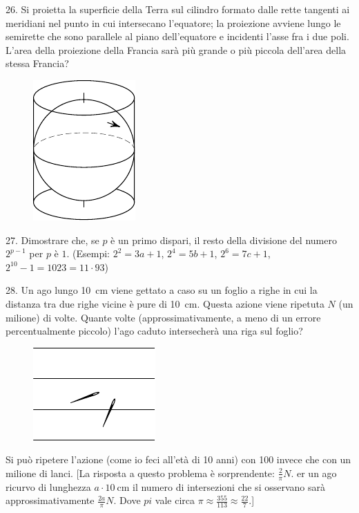 \begin{problem}{26.}
	Si proietta la superficie della Terra sul cilindro formato dalle rette tangenti ai meridiani nel punto in cui intersecano l’equatore; la proiezione avviene lungo le semirette che sono parallele al piano dell’equatore e incidenti l’asse fra i due poli. L’area della proiezione della Francia sarà più grande o più piccola dell’area della stessa Francia?
	\begin{figure}
		\includegraphics{resources/taskbook-10}
	\end{figure}
\end{problem}

\begin{problem}{27.}
	Dimostrare che, se $p$ è un primo dispari, il resto della divisione del numero  $2^{p-1}$ per $p$ è $1$.
	(Esempi: $2^2 = 3a + 1$, $2^4 = 5b+1$, $2^6 = 7c+1$, $2^{10} - 1 = 1023 = 11\cdot 93$)  
\end{problem}

\begin{problem}{28.}
	Un ago lungo \SI{10}{\cm} viene gettato a caso su un foglio a righe in cui la distanza tra due righe vicine è pure di \SI{10}{\cm}. Questa azione viene ripetuta $N$ (un milione) di volte. 
	Quante volte (approssimativamente, a meno di un errore percentualmente piccolo) l’ago caduto intersecherà una riga sul foglio?
	\begin{figure}
		\includegraphics{resources/taskbook-12}
	\end{figure}
	Si può ripetere l’azione (come io feci all’età di 10 anni) con 100 invece che con un milione di lanci. [La risposta a questo problema è sorprendente:  $\frac2{\pi}N$. er un ago ricurvo di lunghezza $a \cdot \SI{10}{\cm}$ il numero di intersezioni che si osservano sarà approssimativamente $\frac{2a}{\pi}N$. 
	Dove  $pi$ vale circa  $\pi \approx  \frac{355}{113} \approx \frac{22}7.$]
\end{problem}

